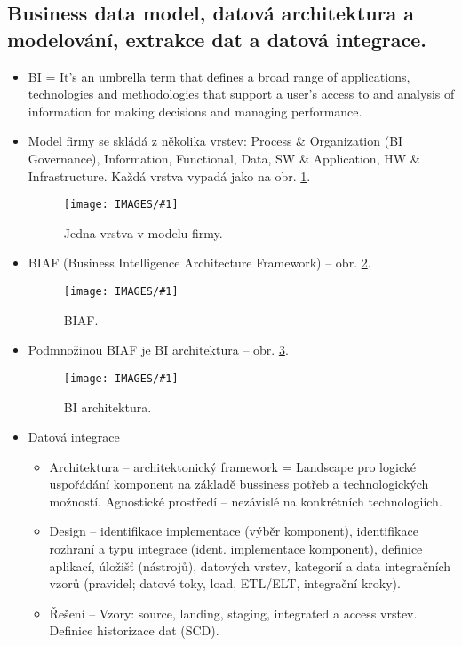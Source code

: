 \documentclass[a4paper,hidelinks]{article}
\newcommand{\myimage}[1] {\texttt{[image: IMAGES/\#1]}}
\newcommand{\myimagebig}[1] {\texttt{[image: IMAGES/\#1]}}
\begin{document}
\subsection{Business data model, datová architektura a modelování, extrakce dat a datová integrace.}

\begin{itemize}
    \item BI = It's an umbrella term that defines a broad range of applications, technologies and methodologies that support a user's access to and analysis of information for making decisions and managing performance.
    \item Model firmy se skládá z několika vrstev: Process \& Organization (BI Governance), Information, Functional, Data, SW \& Application, HW \& Infrastructure.
    Každá vrstva vypadá jako na obr. \ref{fig:model_firmy}.
    \begin{figure}[h]\centering
        \myimage{model_firmy}
        \caption{Jedna vrstva v modelu firmy.}\label{fig:model_firmy}
    \end{figure}
    \item BIAF (Business Intelligence Architecture Framework) -- obr. \ref{fig:biaf}.
    \begin{figure}[h]\centering
        \myimagebig{biaf}
        \caption{BIAF.}\label{fig:biaf}
    \end{figure}
    \item Podmnožinou BIAF je BI architektura -- obr. \ref{fig:prakticke_schema}.
    \begin{figure}[h]\centering
        \myimagebig{prakticke_schema}
        \caption{BI architektura.}\label{fig:prakticke_schema}
    \end{figure}
    \item Datová integrace
    \begin{itemize}
        \item Architektura -- architektonický framework = Landscape pro logické uspořádání komponent na základě bussiness potřeb a technologických možností. Agnostické prostředí -- nezávislé na konkrétních technologiích.
        \item Design -- identifikace implementace (výběr komponent), identifikace rozhraní a typu integrace (ident. implementace komponent), definice aplikací, úložišť (nástrojů), datových vrstev, kategorií a data integračních vzorů (pravidel; datové toky, load, ETL/ELT, integrační kroky).
        \item Řešení -- Vzory: source, landing, staging, integrated a access vrstev. Definice historizace dat (SCD).
    \end{itemize}
\end{itemize}
\end{document}
